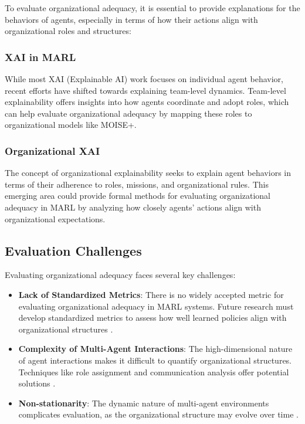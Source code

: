 \documentclass[sigconf,anonymous]{aamas}
\begin{document}
To evaluate organizational adequacy, it is essential to provide explanations for the behaviors of agents, especially in terms of how their actions align with organizational roles and structures:

\subsubsection{XAI in MARL}
While most XAI (Explainable AI) work focuses on individual agent behavior, recent efforts have shifted towards explaining team-level dynamics. Team-level explainability \cite{du2020team} offers insights into how agents coordinate and adopt roles, which can help evaluate organizational adequacy by mapping these roles to organizational models like MOISE+.

\subsubsection{Organizational XAI}
The concept of organizational explainability \cite{veksler2022xai} seeks to explain agent behaviors in terms of their adherence to roles, missions, and organizational rules. This emerging area could provide formal methods for evaluating organizational adequacy in MARL by analyzing how closely agents’ actions align with organizational expectations.

\subsection{Evaluation Challenges}

Evaluating organizational adequacy faces several key challenges:

\begin{itemize}
    \item \textbf{Lack of Standardized Metrics}: There is no widely accepted metric for evaluating organizational adequacy in MARL systems. Future research must develop standardized metrics to assess how well learned policies align with organizational structures \cite{altman1999constrained,le2022multi}.
    \item \textbf{Complexity of Multi-Agent Interactions}: The high-dimensional nature of agent interactions makes it difficult to quantify organizational structures. Techniques like role assignment and communication analysis offer potential solutions \cite{kok2006collaborative,du2020team}.
    \item \textbf{Non-stationarity}: The dynamic nature of multi-agent environments complicates evaluation, as the organizational structure may evolve over time \cite{le2022multi}.
\end{itemize}
\end{document}
